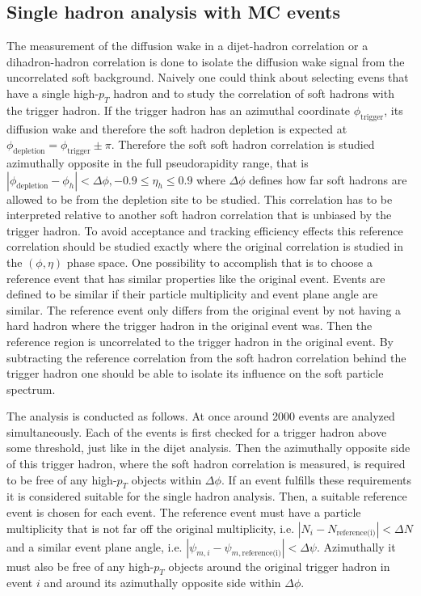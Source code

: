 \documentclass[
  a4paper,
  12pt,
  oneside,
  parskip=half,
  listof=totoc,
  bibliography=totoc,
  DIV=12,
  numbers=noenddot,
  BA.tex
  ]{subfiles}
\begin{document}
\iffalse

\subsection{Single hadron analysis with MC events}


The measurement of the diffusion wake in a dijet-hadron correlation or a dihadron-hadron correlation is done to isolate the diffusion wake signal from the uncorrelated soft background. Naively one could think about selecting evens that have a single high-$p_T$ hadron and to study the correlation of soft hadrons with the trigger hadron. If the trigger hadron has an azimuthal coordinate $\phi_\text{trigger}$, its diffusion wake and therefore the soft hadron depletion is expected at $\phi_\text{depletion} =  \phi_\text{trigger} \pm \pi$. Therefore the soft soft hadron correlation is studied azimuthally opposite in the full pseudorapidity range, that is $|\phi_\text{depletion} - \phi_h| < \Delta \phi, -0.9 \leq \eta_h \leq 0.9$ where $\Delta \phi$ defines how far soft hadrons are allowed to be from the depletion site to be studied. This correlation has to be interpreted relative to another soft hadron correlation that is unbiased by the trigger hadron. To avoid acceptance and tracking efficiency effects this reference correlation should be studied exactly where the original correlation is studied in the $(\phi, \eta)$ phase space. One possibility to accomplish that is to choose a reference event that has similar properties like the original event. Events are defined to be similar if their particle multiplicity and event plane angle are similar. The reference event only differs from the original event by not having a hard hadron where the trigger hadron in the original event was. Then the reference region is uncorrelated to the trigger hadron in the original event. By subtracting the reference correlation from the soft hadron correlation behind the trigger hadron one should be able to isolate its influence on the soft particle spectrum.

The analysis is conducted as follows. At once around 2000 events are analyzed simultaneously. Each of the events is first checked for a trigger hadron above some threshold, just like in the dijet analysis. Then the azimuthally opposite side of this trigger hadron, where the soft hadron correlation is measured, is required to be free of any high-$p_T$ objects within $\Delta \phi$. If an event fulfills these requirements it is considered suitable for the single hadron analysis. Then, a suitable reference event is chosen for each event. The reference event must have a particle multiplicity that is not far off the original multiplicity, i.e. $|N_i - N_\text{reference(i)}| < \Delta N$ and a similar event plane angle, i.e. $|\psi_{m,i} - \psi_{m,\text{reference(i)}}| < \Delta \psi$. Azimuthally it must also be free of any high-$p_T$ objects around the original trigger hadron in event $i$ and around its azimuthally opposite side within $\Delta \phi$. 
\end{document}
